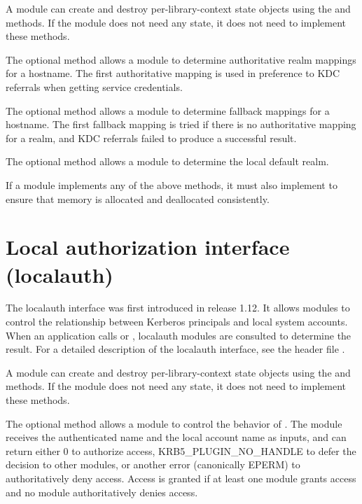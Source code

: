 \documentclass[letterpaper,10pt,english]{sphinxmanual}
\begin{document}
A module can create and destroy per-library-context state objects
using the  and  methods.  If the module does not need
any state, it does not need to implement these methods.

The optional  method allows a module to determine
authoritative realm mappings for a hostname.  The first authoritative
mapping is used in preference to KDC referrals when getting service
credentials.

The optional  method allows a module to determine
fallback mappings for a hostname.  The first fallback mapping is tried
if there is no authoritative mapping for a realm, and KDC referrals
failed to produce a successful result.

The optional  method allows a module to determine the
local default realm.

If a module implements any of the above methods, it must also
implement  to ensure that memory is allocated and
deallocated consistently.


\section{Local authorization interface (localauth)}
\label{\detokenize{plugindev/localauth:local-authorization-interface-localauth}}\label{\detokenize{plugindev/localauth:localauth-plugin}}\label{\detokenize{plugindev/localauth::doc}}
The localauth interface was first introduced in release 1.12.  It
allows modules to control the relationship between Kerberos principals
and local system accounts.  When an application calls
 or , localauth
modules are consulted to determine the result.  For a detailed
description of the localauth interface, see the header file
.

A module can create and destroy per-library-context state objects
using the  and  methods.  If the module does not need
any state, it does not need to implement these methods.

The optional  method allows a module to control the behavior
of .  The module receives the authenticated name
and the local account name as inputs, and can return either 0 to
authorize access, KRB5\_PLUGIN\_NO\_HANDLE to defer the decision to other
modules, or another error (canonically EPERM) to authoritatively deny
access.  Access is granted if at least one module grants access and no
module authoritatively denies access.
\end{document}
